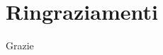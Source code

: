 \documentclass[target=bach,aauheader=,style=]{thud}
\begin{document}
\chapter{Ringraziamenti}
Grazie






\end{document}
